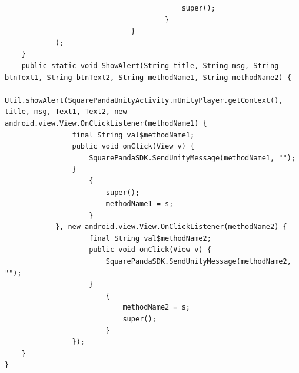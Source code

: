 \documentclass[9pt, b5paper]{article}
\begin{document}
\begin{verbatim}
                                          super();
                                      }
                              }
            );
    }
    public static void ShowAlert(String title, String msg, String btnText1, String btnText2, String methodName1, String methodName2) {
        Util.showAlert(SquarePandaUnityActivity.mUnityPlayer.getContext(), title, msg, Text1, Text2, new android.view.View.OnClickListener(methodName1) {
                final String val$methodName1;
                public void onClick(View v) {
                    SquarePandaSDK.SendUnityMessage(methodName1, "");
                }
                    {
                        super();
                        methodName1 = s;
                    }
            }, new android.view.View.OnClickListener(methodName2) {
                    final String val$methodName2;
                    public void onClick(View v) {
                        SquarePandaSDK.SendUnityMessage(methodName2, "");
                    }
                        {
                            methodName2 = s;
                            super();
                        }
                });
    }
}
\end{verbatim}
\end{document}
